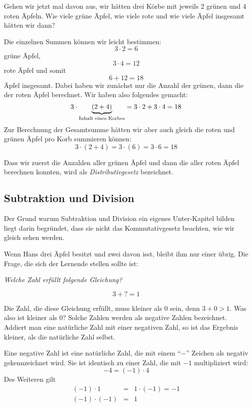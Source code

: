 Gehen wir jetzt mal davon aus, wir hätten drei Körbe mit jeweils 2 grünen und 4 roten Äpfeln. Wie viele grüne Äpfel, wie viele rote und wie viele Äpfel insgesamt hätten wir dann?

Die einzelnen Summen können wir leicht bestimmen: 
\[3\cdot 2 = 6\]
grüne Äpfel,
\[3\cdot 4 = 12 \]
rote Äpfel und somit
\[6+12 = 18\]
Äpfel insgesamt. Dabei haben wir zunächst nur die Anzahl der grünen, dann die der roten Äpfel berechnet. Wir haben also folgendes gemacht:
\[3\cdot \underbrace{(2+4)}_{\textnormal{Inhalt eines Korbes}} = 3\cdot 2 + 3\cdot 4 = 18\]
Zur Berechnung der Gesamtsumme hätten wir aber auch gleich die roten und grünen Äpfel pro Korb summieren können:
\[3\cdot (2+4) = 3\cdot (6) = 3\cdot 6 = 18 \]

Dass wir zuerst die Anzahlen aller grünen Äpfel und dann die aller roten Äpfel berechnen konnten, wird als  \textsl{Distributivgesetz} bezeichnet.

\subsection{Subtraktion und Division}

Der Grund warum Subtraktion und Division ein eigenes Unter-Kapitel bilden liegt darin begründet, dass sie nicht das Kommutativgesetz beachten, wie wir gleich sehen werden.

Wenn Hans drei Äpfel besitzt und zwei davon isst, bleibt ihm nur einer übrig. Die Frage, die sich der Lernende stellen sollte ist:

\textsl{Welche Zahl erfüllt folgende Gleichung?}

\[3 + ? = 1\]

Die Zahl, die diese Gleichung erfüllt, muss kleiner als 0 sein, denn $3+0 > 1$. Was also ist kleiner als 0? Solche Zahlen werden als negative Zahlen bezeichnet. Addiert man eine natürliche Zahl mit einer negativen Zahl, so ist das Ergebnis kleiner, als die natürliche Zahl selbst. 

\begin{definition}
Eine negative Zahl ist eine natürliche Zahl, die mit einem "`$-$"' Zeichen als negativ gekennzeichnet wird. Sie ist identisch zu einer Zahl, die mit $-1$ multipliziert wird:
\[ -4 = (-1) \cdot 4 \]
Des Weiteren gilt
\begin{eqnarray*}
(-1)\cdot 1 &=& 1\cdot (-1) = -1 \\
(-1)\cdot (-1) &=& 1
\end{eqnarray*}

\end{definition}

